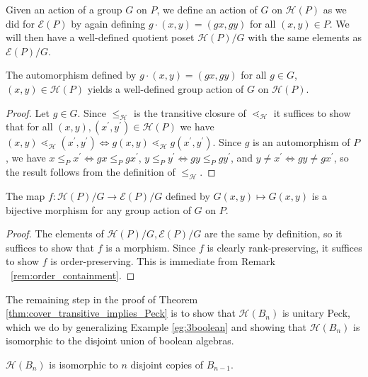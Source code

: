 \documentclass[smallextended, envcountsame, numbook]{svjour3}
\numberwithin{equation}{section}
\renewcommand{\iff}{\Leftrightarrow}
\begin{document}
Given an action of a group $G$ on $P$, we define an action of $G$ on $\mathcal{H}(P)$ as we did for $\mathcal{E}(P)$ by again defining $g\cdot (x,y) = (gx,gy)$ for all $(x,y)\in P$.  We will then have a well-defined quotient poset $\mathcal{H}(P)/G$ with the same elements as $\mathcal{E}(P)/G$.


\begin{lemma}
\label{lem:G_action_on_HP}
The automorphism defined by $g\cdot (x, y)= (gx, gy)$ for all $g\in G$, $(x, y)\in \mathcal{H}(P)$ yields a well-defined group action of $G$ on $\mathcal{H}(P)$.
\end{lemma}

\begin{proof}
Let $g\in G$.  Since $\le_{\mathcal{H}}$ is the transitive closure of $\lessdot_{\mathcal{H}}$ it suffices to show that for all $(x,y),(x^\prime,y^\prime)\in \mathcal{H}(P)$ we have $(x, y) \lessdot_{\mathcal H} (x^\prime,y^\prime) \iff g(x, y) \lessdot_{\mathcal H} g(x^\prime, y^\prime)$.  Since $g$ is an automorphism of $P$, we have $x\le_P x^\prime \iff gx\le_P gx^\prime$, $y\le_P y^\prime \iff gy\le_P gy^\prime$, and $y\neq x^\prime \iff gy\neq gx^\prime$, so the result follows from the definition of $\le_{\mathcal{H}}$.
\end{proof}

\begin{lemma}
\label{lem:bijection_h_f}
The map $f\colon\mathcal H(P)/G \rightarrow \mathcal E(P)/G$ defined by $G(x,y) \mapsto G(x,y)$ is a bijective morphism for any group action of $G$ on $P$.
\end{lemma}

\begin{proof}
The elements of $\mathcal H(P)/G,\mathcal E(P)/G$ are the same by definition, so it suffices to show that $f$ is a morphism. Since $f$ is clearly rank-preserving, it suffices to show $f$ is order-preserving. This is immediate from Remark ~\ref{rem:order_containment}.
\end{proof}

The remaining step in the proof of Theorem \ref{thm:cover_transitive_implies_Peck} is to show that $\mathcal{H}(B_n)$ is unitary Peck, which we do by generalizing Example \ref{eg:3boolean} and showing that $\mathcal{H}(B_n)$ is isomorphic to the disjoint union of boolean algebras.

\begin{proposition}\label{prop:computing_HBn}
$\mathcal{H}(B_n)$ is isomorphic to $n$ disjoint copies of $B_{n-1}$.
\end{proposition}
\end{document}
